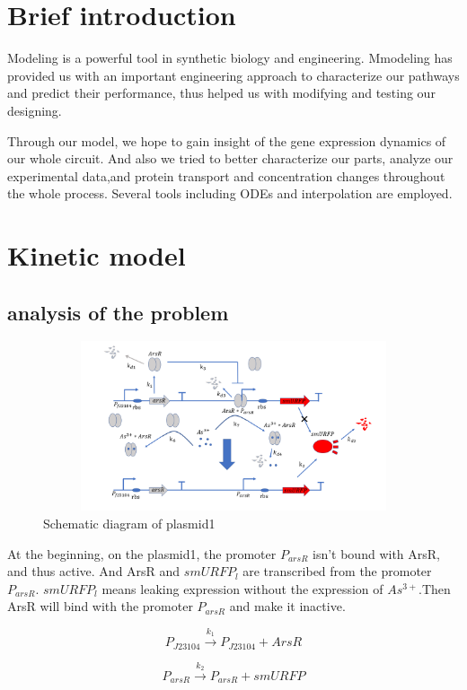 \section{Brief introduction}
Modeling is a powerful tool in synthetic biology and engineering. Mmodeling has provided us with an important engineering approach to characterize our pathways and predict their performance, thus helped us with modifying and testing our designing.

Through our model, we hope to gain insight of the gene expression dynamics of our whole circuit. And also we tried to better characterize our parts, analyze our experimental data,and protein transport and concentration changes throughout the whole process. Several tools including ODEs and interpolation are employed.


\section{Kinetic model}
\subsection{analysis of the problem}

\begin{figure}[h]
\centering
\includegraphics[width=12cm,height=5cm]{1}
\caption{Schematic diagram of plasmid1}
\end{figure}

At the beginning, on the plasmid1, the promoter $P_{arsR}$ isn't bound with ArsR, and thus active. And ArsR and $smURFP_l$ are transcribed from the promoter $P_{arsR}$. $smURFP_l$ means leaking expression without the expression of $As^{3+}$.Then ArsR will bind with the promoter $P_{arsR}$ and make it inactive. \cite{pola2018novel}

\begin{equation}
P_{J23104} \stackrel{k_1}{\longrightarrow} P_{J23104}+ArsR
\end{equation}

\begin{equation}
P_{arsR} \stackrel{k_2}{\longrightarrow} P_{arsR} +smURFP
\end{equation}

